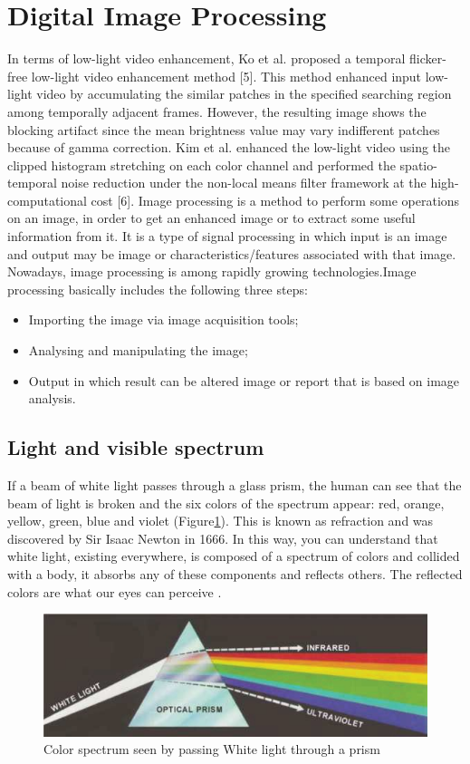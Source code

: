 \section{Digital Image Processing}
In terms of low-light video enhancement, Ko et al. proposed a temporal flicker-free low-light video enhancement method [5]. This method enhanced input low-light video by accumulating the similar patches in the specified searching region among temporally adjacent frames. However, the resulting image shows the blocking artifact since the mean brightness value may vary indifferent patches because of gamma correction. Kim et al. enhanced the low-light video using the clipped histogram stretching on each color channel and performed the spatio-temporal noise reduction under the non-local means filter framework at the high-computational cost [6]. Image processing is a method to perform some operations on an image, in order to get an enhanced image or to extract some useful information from it. It is a type of signal processing in which input is an image and output may be image or characteristics/features associated with that image. Nowadays, image processing is among rapidly growing technologies.Image processing basically includes the following three steps:
\begin{itemize}
	\item Importing the image via image acquisition tools;
	\item Analysing and manipulating the image;
	\item Output in which result can be altered image or report that is based on image analysis.  
\end{itemize}

\subsection{Light and visible spectrum}
If a beam of white light passes through a glass prism, the human can see that the beam of light is broken and the six colors of the spectrum appear: red, orange, yellow, green, blue and violet (Figure\ref{fig:colorSpectrum}). This is known as refraction and was discovered by Sir Isaac Newton in 1666. In this way, you can understand that white light, existing everywhere, is composed of a spectrum of colors and collided with a body, it absorbs any of these components and reflects others. The reflected colors are what our eyes can perceive \cite{dip1}.
\begin{figure}
  \includegraphics[width=\linewidth]{images/ch2/colorSpectrum.jpg}
  \caption{Color spectrum seen by passing White light through a prism}
  \label{fig:colorSpectrum}
\end{figure}

